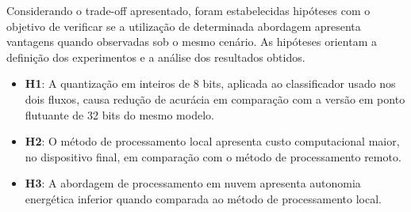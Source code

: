 Considerando o trade-off apresentado, 
foram estabelecidas hipóteses com o objetivo de verificar 
se a utilização de determinada abordagem apresenta vantagens 
quando observadas sob o mesmo cenário.
As hipóteses orientam a definição dos experimentos e a 
análise dos resultados obtidos.

\begin{itemize}
	\item \textbf{H1}: A quantização em inteiros de 8 bits, aplicada ao classificador usado nos dois fluxos, causa redução de acurácia em comparação com a versão em ponto flutuante de 32 bits do mesmo modelo.
    \item \textbf{H2}: O método de processamento local apresenta custo computacional maior, no dispositivo final, em comparação com o método de processamento remoto.
    \item \textbf{H3}: A abordagem de processamento em nuvem apresenta autonomia energética inferior quando comparada ao método de processamento local.
\end{itemize} 